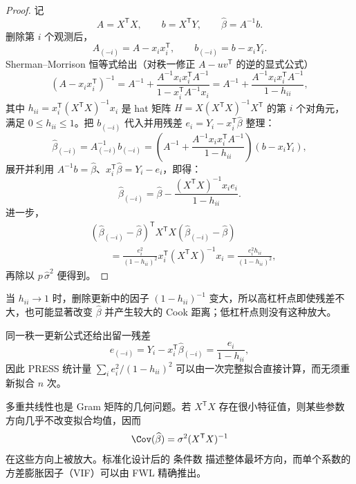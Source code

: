 \begin{proof}
记
\[
 A=X^{\mathsf T}X,
 \qquad
 b=X^{\mathsf T}Y,
 \qquad
 \widehat\beta=A^{-1}b.
\]
删除第 $i$ 个观测后，
\[
 A_{(-i)}=A-x_ix_i^{\mathsf T},
 \qquad
 b_{(-i)}=b-x_iY_i.
\]
Sherman--Morrison 恒等式给出（对秩一修正 $A-uv^{\mathsf T}$ 的逆的显式公式）
\[
 (A-x_ix_i^{\mathsf T})^{-1}
 =A^{-1}
 +\frac{A^{-1}x_ix_i^{\mathsf T}A^{-1}}
 {1-x_i^{\mathsf T}A^{-1}x_i}
 =A^{-1}
 +\frac{A^{-1}x_ix_i^{\mathsf T}A^{-1}}{1-h_{ii}},
\]
其中 $h_{ii}=x_i^{\mathsf T}(X^{\mathsf T}X)^{-1}x_i$ 是 hat 矩阵 $H=X(X^{\mathsf T}X)^{-1}X^{\mathsf T}$ 的第 $i$ 个对角元，满足 $0\le h_{ii}\le1$。把 $b_{(-i)}$ 代入并用残差 $e_i=Y_i-x_i^{\mathsf T}\widehat\beta$ 整理：
\[
\widehat\beta_{(-i)}
=A_{(-i)}^{-1}b_{(-i)}
=\left(A^{-1}+\frac{A^{-1}x_ix_i^{\mathsf T}A^{-1}}{1-h_{ii}}\right)(b-x_iY_i),
\]
展开并利用 $A^{-1}b=\widehat\beta$、$x_i^{\mathsf T}\widehat\beta=Y_i-e_i$，即得：
\[
\widehat\beta_{(-i)}=\widehat\beta-\frac{(X^{\mathsf T}X)^{-1}x_i e_i}{1-h_{ii}}.
\]
进一步，
\begin{align*}
 &(\widehat\beta_{(-i)}-\widehat\beta)^{\mathsf T}
 X^{\mathsf T}X
 (\widehat\beta_{(-i)}-\widehat\beta)\\
 &\qquad
 =\frac{e_i^2}{(1-h_{ii})^2}
 x_i^{\mathsf T}(X^{\mathsf T}X)^{-1}x_i
 =\frac{e_i^2h_{ii}}{(1-h_{ii})^2},
\end{align*}
再除以 $p\,\widehat\sigma^2$ 便得到。
\end{proof}

\begin{note}[高杠杆放大与留一预测]
当 $h_{ii}\to1$ 时，删除更新中的因子 $(1-h_{ii})^{-1}$ 变大，所以高杠杆点即使残差不大，也可能显著改变 $\widehat\beta$ 并产生较大的 Cook 距离；低杠杆点则没有这种放大。

同一秩一更新公式还给出留一残差
\[
e_{(-i)}=Y_i-x_i^{\mathsf T}\widehat\beta_{(-i)}=\frac{e_i}{1-h_{ii}},
\]
因此 PRESS 统计量 $\sum_i e_i^2/(1-h_{ii})^2$ 可以由一次完整拟合直接计算，而无须重新拟合 $n$ 次。
\end{note}

多重共线性也是 Gram 矩阵的几何问题。若 $X^{\mathsf T}X$ 存在很小特征值，则某些参数方向几乎不改变拟合均值，因而
\[
 \Cov(\widehat\beta)=\sigma^2(X^{\mathsf T}X)^{-1}
\]
在这些方向上被放大。标准化设计后的 条件数 描述整体最坏方向，而单个系数的 方差膨胀因子（VIF）可以由 FWL 精确推出。

